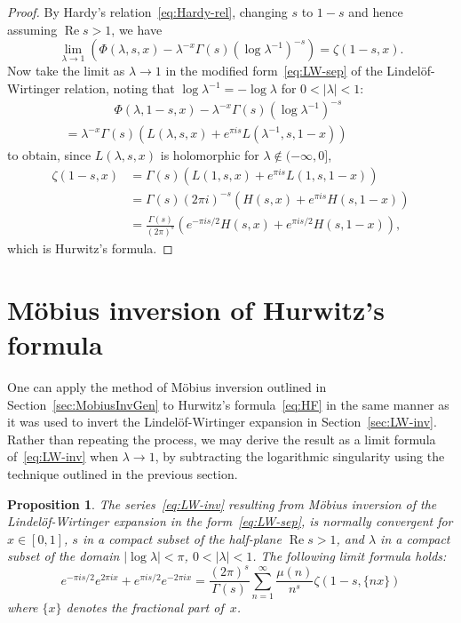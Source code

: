 \documentclass[11pt,a4paper,reqno]{amsart}
\renewcommand{\Re}{\operatorname{Re}}
\theoremstyle{plain}
\newtheorem{prop}[theorem]{Proposition}
\theoremstyle{remark}
\numberwithin{equation}{section}
\begin{document}
\begin{proof}
By Hardy's relation~\eqref{eq:Hardy-rel}, changing $s$ to $1-s$ and hence assuming $\Re s > 1$, we have
\[
	\lim_{\lambda \to 1} \left(\Phi(\lambda,s,x) - \lambda^{-x}\Gamma(s){(\log \lambda^{-1})}^{-s}\right) = \zeta(1-s,x).
\]
Now take the limit as $\lambda \to 1$ in the modified form~\eqref{eq:LW-sep} of the Lindel\"of-Wirtinger relation, noting that $\log \lambda^{-1} = -\log \lambda$ for $0 < |\lambda| < 1$:
%
\begin{multline*}
  \qquad\qquad
	  \Phi(\lambda,1-s,x) - \lambda^{-x}\Gamma(s){(\log \lambda^{-1})}^{-s} \\
	  = \lambda^{-x}\Gamma(s)\left(L(\lambda,s,x) + e^{\pi i s} L(\lambda^{-1},s,1-x)\right)
  \qquad\qquad
\end{multline*}
%
to obtain, since $L(\lambda,s,x)$ is holomorphic for $\lambda \notin (-\infty,0]$,
\begin{align*}
	   \zeta(1-s,x) 
	&= \Gamma(s)\left(L(1,s,x) + e^{\pi i s}L(1,s,1-x)\right)
	\\
	&= \Gamma(s)(2\pi i)^{-s}\left(H(s,x) + e^{\pi i s}H(s,1-x)\right)
	\\
	&= \frac{\Gamma(s)}{(2\pi)^{s}} \left(e^{-\pi i s/2}H(s,x) + e^{\pi i s/2}H(s,1-x)\right),
\end{align*}
which is Hurwitz's formula.
\end{proof}


\section{M\"obius inversion of Hurwitz's formula}
\label{sec:HW-Inv}


One can apply the method of M\"obius inversion outlined in Section~\ref{sec:MobiusInvGen} to Hurwitz's formula~\eqref{eq:HF} in the same manner as it was used to invert the Lindel\"of-Wirtinger expansion in Section~\ref{sec:LW-inv}. Rather than repeating the process, we may derive the result as a limit formula of~\eqref{eq:LW-inv} when $\lambda \to 1$, by subtracting the logarithmic singularity using the technique outlined in the previous section.


\begin{prop}
\label{prop:LW-inv-conv}
The series~\eqref{eq:LW-inv} resulting from M\"obius inversion of the Lindel\"of-Wirtinger expansion in the form~\eqref{eq:LW-sep}, is normally convergent for $x \in [0,1]$, $s$ in a compact subset of the half-plane $\Re s > 1$, and $\lambda$ in a compact subset of the domain $|\log\lambda|<\pi$, $0 < |\lambda| < 1$. The following limit formula holds:
%
\begin{equation}
\label{HF-inv}
	e^{-\pi i s/2} e^{2 \pi i x} + e^{\pi i s/2} e^{-2 \pi i x}
	= \frac{(2\pi)^{s}}{\Gamma(s)} \sum_{n=1}^{\infty} \frac{\mu(n)}{n^{s}} \zeta(1-s,\{nx\})
\end{equation}
%
where $\{x\}$ denotes the fractional part of~$x$.
\end{prop}
\end{document}

